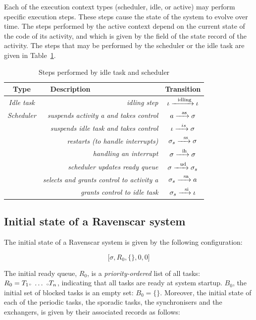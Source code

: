 Each of the execution context types (scheduler, idle, or active) may
perform specific execution steps. These steps cause the state of the
system to evolve over time. The steps performed by the active context
depend on the current state of the code of its activity, and which is
given by the  field of the state record of the activity. The
steps that may be performed by the scheduler or the idle task are
given in Table~\ref{legal_idle_sched}.

\begin{table}
\caption{Steps performed by idle task and scheduler}
\label{legal_idle_sched}
\centering
\begin{tabular}{|c|r|c|}
\hline
\textbf{Type} & \textbf{Description\ \ \ \ \ \ \ \ \ \ \ \ \ \ \ \ \ } & \textbf{Transition}\\
\hline
\emph{Idle task} & \emph{idling step} & $\iota \xrightarrow{\ \ \text{idling}}
\iota$\\
\hline
\emph{Scheduler} & \emph{suspends activity a and takes control} & $a
\xrightarrow{\ \ \text{as}} \sigma$\\
 & \emph{suspends idle task and takes control} &
$\iota\xrightarrow{\ \ is}\sigma$\\ 
 & \emph{restarts (to handle
  interrupts)} & $\sigma_s\xrightarrow{\ \ \text{ss}}\sigma$\\ 
 & \emph{handling an interrupt} & $\sigma\xrightarrow{\ \ \text{ih}}\sigma$\\
 & \emph{scheduler updates ready queue} &
$\sigma\xrightarrow{\ \ \text{ud}}\sigma_s$\\ 
 & \emph{selects and grants control to activity a} &
$\sigma_s\xrightarrow{\ \ \text{sa}}a$\\ 
 & \emph{grants control to idle task} &
$\sigma_s\xrightarrow{\ \ \text{si}}\iota$\\
\hline
\end{tabular}
\end{table}

\subsection{Initial state of a Ravenscar system}

The initial state of a Ravenscar system is given by the following configuration:

\begin{equation}
  \big[ \sigma, R_0, \{\}, 0, 0 \big]
\end{equation}

The initial ready queue, $R_0$, is a \emph{priority-ordered} list of
all tasks: $ R_0 = T_1 {\scriptscriptstyle \circ} \ \ldots \ {\scriptscriptstyle \circ} T_n$, indicating
that all tasks are ready at system startup. $B_0$, the initial set of
blocked tasks is an empty set: $B_0=\{\}$. Moreover, the initial state
of each of the periodic tasks, the sporadic tasks, the synchronisers
and the exchangers, is given by their associated records as follows:\\

